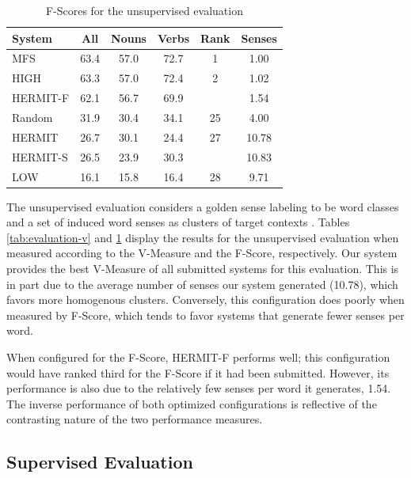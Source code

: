 \documentclass[11pt,a4]{article}
\begin{document}
\begin{table}[htb]
  \small
  \center
  \begin{tabular}{| l | ccccc | }
    \hline
    System & All & Nouns & Verbs & Rank & Senses \\
    \hline
    MFS      & 63.4 & 57.0 & 72.7 & 1 & 1.00 \\
    HIGH     & 63.3 & 57.0 & 72.4 & 2 & 1.02 \\
    HERMIT-F & 62.1 & 56.7 & 69.9 & & 1.54 \\
    Random   & 31.9 & 30.4 & 34.1 & 25 & 4.00 \\
    HERMIT   & 26.7 & 30.1 & 24.4 & 27 & 10.78 \\
    HERMIT-S & 26.5 & 23.9 & 30.3 & & 10.83 \\
    LOW      & 16.1 & 15.8 & 16.4 & 28 & 9.71 \\
    \hline
  \end{tabular}
  \caption{F-Scores for the unsupervised evaluation}
  \label{tab:evaluation-f}
\end{table}


The unsupervised evaluation considers a golden sense labeling to be word classes
and a set of induced word senses as clusters of target contexts
\cite{manandhar09semeval}.  
%
Tables \ref{tab:evaluation-v} and \ref{tab:evaluation-f} display the results for
the unsupervised evaluation when measured according to the V-Measure and the
F-Score, respectively.  Our system provides the best V-Measure of all submitted
systems for this evaluation.  This is in part due to the average number of
senses our system generated (10.78), which favors more homogenous clusters.
Conversely, this configuration does poorly when measured by F-Score, which tends
to favor systems that generate fewer senses per word.  

When configured for the F-Score, HERMIT-F performs well; this configuration
would have ranked third for the F-Score if it had been submitted.  However, its
performance is also due to the relatively few senses per word it generates,
1.54.  The inverse performance of both optimized configurations is reflective of
the contrasting nature of the two performance measures.

\subsection{Supervised Evaluation}
\end{document}
